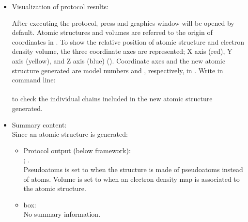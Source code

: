 \begin{itemize}
 \item Visualization of protocol results:
 
 After executing the protocol, press  and \chimera graphics window will be opened by default. Atomic structures and volumes are referred to the origin of coordinates in \chimera. To show the relative position of atomic structure and electron density volume, the three coordinate axes are represented; X axis (red), Y axis (yellow), and Z axis (blue) ().  Coordinate axes and the new atomic structure generated are model numbers  and , respectively, in \chimera {}. Write in \chimera command line:\\
    \\
 to check the individual chains included in the new atomic structure generated.
    
 \item Summary content:\\
 Since an atomic structure is generated:

    \begin{itemize}
     \item Protocol output (below \scipion framework):\\
      ; .\\Pseudoatoms is set to  when the structure is made of pseudoatoms instead of atoms. Volume is set to  when an electron density map is associated to the atomic structure.
     \item {} box:\\No summary information.\\
    \end{itemize}
\end{itemize}

